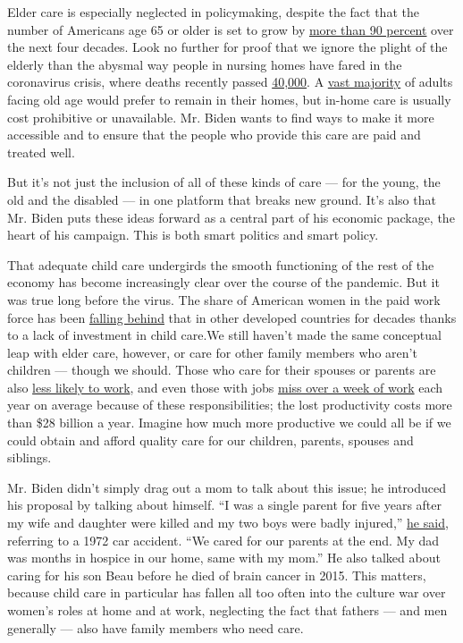 Elder care is especially neglected in policymaking, despite the fact
that the number of Americans age 65 or older is set to grow by
\href{https://www.census.gov/library/visualizations/2018/comm/historic-first.html}{more
than 90 percent} over the next four decades. Look no further for proof
that we ignore the plight of the elderly than the abysmal way people in
nursing homes have fared in the coronavirus crisis, where deaths
recently passed
\href{https://data.cms.gov/stories/s/COVID-19-Nursing-Home-Data/bkwz-xpvg/}{40,000}.
A
\href{https://www.longtermcarepoll.org/long-term-care-in-america-expectations-and-preferences-for-care-and-caregiving/}{vast
majority} of adults facing old age would prefer to remain in their
homes, but in-home care is usually cost prohibitive or unavailable. Mr.
Biden wants to find ways to make it more accessible and to ensure that
the people who provide this care are paid and treated well.

But it's not just the inclusion of all of these kinds of care --- for
the young, the old and the disabled --- in one platform that breaks new
ground. It's also that Mr. Biden puts these ideas forward as a central
part of his economic package, the heart of his campaign. This is both
smart politics and smart policy.

That adequate child care undergirds the smooth functioning of the rest
of the economy has become increasingly clear over the course of the
pandemic. But it was true long before the virus. The share of American
women in the paid work force has been
\href{http://ftp.iza.org/dp7140.pdf}{falling behind} that in other
developed countries for decades thanks to a lack of investment in child
care.We still haven't made the same conceptual leap with elder care,
however, or care for other family members who aren't children --- though
we should. Those who care for their spouses or parents are also
\href{https://www.urban.org/research/publication/impact-informal-caregiving-older-adults-laborsupply-and-economic-resources}{less
likely to work}, and even those with jobs
\href{http://news.gallup.com/businessjournal/151049/cost-caregiving-economy.aspx}{miss
over a week of work} each year on average because of these
responsibilities; the lost productivity costs more than \$28 billion a
year. Imagine how much more productive we could all be if we could
obtain and afford quality care for our children, parents, spouses and
siblings.

Mr. Biden didn't simply drag out a mom to talk about this issue; he
introduced his proposal by talking about himself. ``I was a single
parent for five years after my wife and daughter were killed and my two
boys were badly injured,''
\href{https://www.cnbc.com/2020/07/21/biden-to-unveil-775-billion-plan-to-fund-child-care-and-elder-care.html}{he
said}, referring to a 1972 car accident. ``We cared for our parents at
the end. My dad was months in hospice in our home, same with my mom.''
He also talked about caring for his son Beau before he died of brain
cancer in 2015. This matters, because child care in particular has
fallen all too often into the culture war over women's roles at home and
at work, neglecting the fact that fathers --- and men generally --- also
have family members who need care.

